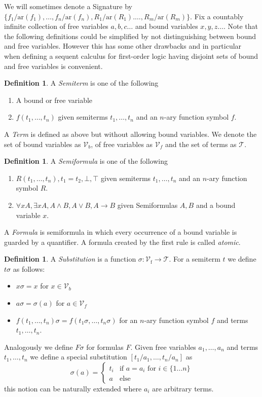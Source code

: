\documentclass[onehalfspacing]{article}
\theoremstyle{definition}
\theoremstyle{definition}
\theoremstyle{definition}
\theoremstyle{definition}
\theoremstyle{definition}
\newtheorem{definition}[theorem]{Definition}
\theoremstyle{definition}
\begin{document}
\noindent We will sometimes denote a Signature by $\{f_1/\text{ar}(f_1),\dots,f_n/\text{ar}(f_n), R_1/\text{ar}(R_1).\dots,R_m/\text{ar}(R_m)\}$.
Fix a countably infinite collection of free variables $a, b, c\dots$ and bound variables $x, y, z\dots$.
Note that the following definitions could be simplified by not distinguishing between bound and free variables. However this has some other drawbacks and in particular when defining a sequent calculus for first-order logic having disjoint sets of bound and free variables is convenient.

\begin{definition}
	A \textit{Semiterm} is one of the following
	\begin{enumerate}
		\item A bound or free variable
		\item $f(t_1, \dots, t_n)$ given semiterms $t_1,\dots,t_n$ and an $n$-ary function symbol $f$.
	\end{enumerate}
	A \textit{Term} is defined as above but without allowing bound variables. We denote the set of bound variables as $\mathcal{V}_b$, of free variables as $\mathcal{V}_f$ and the set of terms as $\mathcal{T}$.
\end{definition}

\begin{definition}
	A \textit{Semiformula} is one of the following
	\begin{enumerate}
		\item $R(t_1, \dots, t_n), t_1 = t_2, \bot, \top$ given semiterms $t_1,\dots,t_n$ and an $n$-ary function symbol $R$.
		\item $\forall x A, \exists x A, A\wedge B, A\vee B, A\to B$ given Semiformulas $A, B$ and a bound variable $x$.
	\end{enumerate}
	A \textit{Formula} is semiformula in which every occurrence of a bound variable is guarded by a quantifier. A formula created by the first rule is called \textit{atomic}.
\end{definition}

\begin{definition}
	A \textit{Substitution} is a function $\sigma: \mathcal{V}_\text{f}\to\mathcal{T}$. For a semiterm $t$ we define $t\sigma$ as follows:
	\begin{itemize}
		\item $x\sigma = x$ for $x\in \mathcal{V}_b$
		\item $a\sigma = \sigma(a)$ for $a\in \mathcal{V}_f$
		\item $f(t_1,\dots,t_n)\sigma = f(t_1\sigma,\dots,t_n\sigma)$ for an $n$-ary function symbol $f$ and terms $t_1,\dots,t_n$.
	\end{itemize}
	Analogously we define $F\sigma$ for formulas $F$. Given free variables $a_1,\dots,a_n$ and terms $t_1,\dots,t_n$ we define a special substitution $[t_1/a_1,\dots,t_n/a_n]$ as $$\sigma(a) = \begin{cases}
		t_i & \text{if } a = a_i \text{ for } i \in \{1\dots n\}\\
		a & \text{else}
	\end{cases}$$this notion can be naturally extended where $a_i$ are arbitrary terms.
\end{definition}
\end{document}
